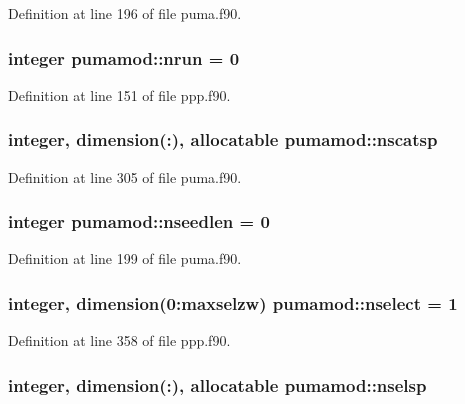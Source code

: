 \-Definition at line 196 of file puma.\-f90.

\hypertarget{classpumamod_a461c71616d123104512f1679325a8ecf}{
\subsubsection[{nrun}]{\setlength{\rightskip}{0pt plus 5cm}integer {\bf pumamod\-::nrun} = 0}}
\label{classpumamod_a461c71616d123104512f1679325a8ecf}


\-Definition at line 151 of file ppp.\-f90.

\hypertarget{classpumamod_a8a778542c0d1ac00f0d4ccffe08f7190}{
\subsubsection[{nscatsp}]{\setlength{\rightskip}{0pt plus 5cm}integer, dimension(\-:), allocatable {\bf pumamod\-::nscatsp}}}
\label{classpumamod_a8a778542c0d1ac00f0d4ccffe08f7190}


\-Definition at line 305 of file puma.\-f90.

\hypertarget{classpumamod_af9d1e5f558a9b0151f81e27c4ea6c361}{
\subsubsection[{nseedlen}]{\setlength{\rightskip}{0pt plus 5cm}integer {\bf pumamod\-::nseedlen} = 0}}
\label{classpumamod_af9d1e5f558a9b0151f81e27c4ea6c361}


\-Definition at line 199 of file puma.\-f90.

\hypertarget{classpumamod_af4ef7f7d21aa9c3043e4efaa1a0b0c3e}{
\subsubsection[{nselect}]{\setlength{\rightskip}{0pt plus 5cm}integer, dimension(0\-:maxselzw) {\bf pumamod\-::nselect} = 1}}
\label{classpumamod_af4ef7f7d21aa9c3043e4efaa1a0b0c3e}


\-Definition at line 358 of file ppp.\-f90.

\hypertarget{classpumamod_a4f4aaa4c774bb1500caa0de7ca16bbe8}{
\subsubsection[{nselsp}]{\setlength{\rightskip}{0pt plus 5cm}integer, dimension(\-:), allocatable {\bf pumamod\-::nselsp}}}
\label{classpumamod_a4f4aaa4c774bb1500caa0de7ca16bbe8}


